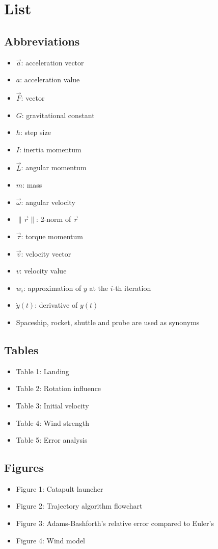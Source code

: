 \documentclass[10pt,a4paper]{article}
\begin{document}
	\newpage
	
	\tableofcontents
	\newpage
	
	\section{List}
	\subsection{Abbreviations}
	\begin{itemize}
		\item $\vec{a}$: acceleration vector
		\item $a$: acceleration value
		\item $\vec{F}$: vector
		\item $G$: gravitational constant
		\item $h$: step size
		\item $I$: inertia momentum
		\item $\vec{L}$: angular momentum
		\item $m$: mass
		\item $\vec{\omega}$: angular velocity
		\item $\|\vec{r}\|$: 2-norm of $\vec{r}$
		\item $\vec{\tau}$: torque momentum
		\item $\vec{v}$: velocity vector
		\item $v$: velocity value        
		\item $w_i$: approximation of $y$ at the $i$-th iteration
		\item $\dot{y}(t)$: derivative of $y(t)$    
		\item Spaceship, rocket, shuttle and probe are used as synonyms     
	\end{itemize}
	\subsection{Tables}
	\begin{itemize}
		\item Table 1: Landing
		\item Table 2: Rotation influence
		\item Table 3: Initial velocity
		\item Table 4: Wind strength
		\item Table 5: Error analysis
	\end{itemize}
	
	\subsection{Figures}
	\begin{itemize}
		\item Figure 1: Catapult launcher
		\item Figure 2: Trajectory algorithm flowchart     
		\item Figure 3: Adams-Bashforth's relative error compared to Euler's
		\item Figure 4: Wind model
	\end{itemize}
	
\end{document}

